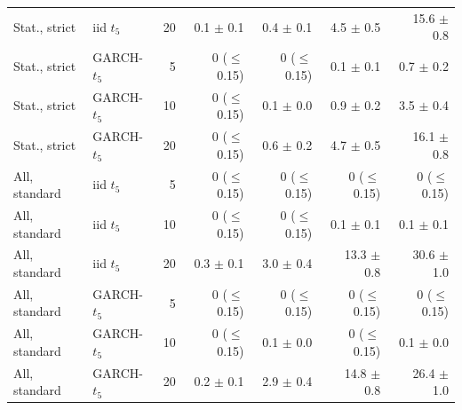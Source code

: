 \begin{table}[H]
\begin{tabular}{llrrrrr}
Stat., strict & iid $t_5$ & 20 & 0.1 $\pm$ 0.1 & 0.4 $\pm$ 0.1 & 4.5 $\pm$ 0.5 & 15.6 $\pm$ 0.8 \\
Stat., strict & GARCH-$t_5$ & 5 & 0 ($\le$ 0.15) & 0 ($\le$ 0.15) & 0.1 $\pm$ 0.1 & 0.7 $\pm$ 0.2 \\
Stat., strict & GARCH-$t_5$ & 10 & 0 ($\le$ 0.15) & 0.1 $\pm$ 0.0 & 0.9 $\pm$ 0.2 & 3.5 $\pm$ 0.4 \\
Stat., strict & GARCH-$t_5$ & 20 & 0 ($\le$ 0.15) & 0.6 $\pm$ 0.2 & 4.7 $\pm$ 0.5 & 16.1 $\pm$ 0.8 \\
\midrule
All, standard & iid $t_5$ & 5 & 0 ($\le$ 0.15) & 0 ($\le$ 0.15) & 0 ($\le$ 0.15) & 0 ($\le$ 0.15) \\
All, standard & iid $t_5$ & 10 & 0 ($\le$ 0.15) & 0 ($\le$ 0.15) & 0.1 $\pm$ 0.1 & 0.1 $\pm$ 0.1 \\
All, standard & iid $t_5$ & 20 & 0.3 $\pm$ 0.1 & 3.0 $\pm$ 0.4 & 13.3 $\pm$ 0.8 & 30.6 $\pm$ 1.0 \\
All, standard & GARCH-$t_5$ & 5 & 0 ($\le$ 0.15) & 0 ($\le$ 0.15) & 0 ($\le$ 0.15) & 0 ($\le$ 0.15) \\
All, standard & GARCH-$t_5$ & 10 & 0 ($\le$ 0.15) & 0.1 $\pm$ 0.0 & 0 ($\le$ 0.15) & 0.1 $\pm$ 0.0 \\
All, standard & GARCH-$t_5$ & 20 & 0.2 $\pm$ 0.1 & 2.9 $\pm$ 0.4 & 14.8 $\pm$ 0.8 & 26.4 $\pm$ 1.0 \\
\bottomrule
\end{tabular}
\end{table}
